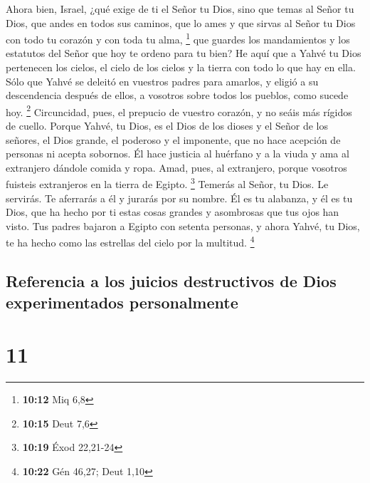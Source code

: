  Ahora bien, Israel, ¿qué exige de ti el Señor tu Dios,
sino que temas al Señor tu Dios, que andes en todos sus caminos, que lo
ames y que sirvas al Señor tu Dios con todo tu corazón y con toda tu
alma, \footnote{\textbf{10:12} Miq 6,8}  que guardes los
mandamientos y los estatutos del Señor que hoy te ordeno para tu bien?
 He aquí que a Yahvé tu Dios pertenecen los cielos, el
cielo de los cielos y la tierra con todo lo que hay en ella.
 Sólo que Yahvé se deleitó en vuestros padres para
amarlos, y eligió a su descendencia después de ellos, a vosotros sobre
todos los pueblos, como sucede hoy. \footnote{\textbf{10:15} Deut 7,6}
 Circuncidad, pues, el prepucio de vuestro corazón, y no
seáis más rígidos de cuello.  Porque Yahvé, tu Dios, es
el Dios de los dioses y el Señor de los señores, el Dios grande, el
poderoso y el imponente, que no hace acepción de personas ni acepta
sobornos.  Él hace justicia al huérfano y a la viuda y
ama al extranjero dándole comida y ropa.  Amad, pues, al
extranjero, porque vosotros fuisteis extranjeros en la tierra de Egipto.
\footnote{\textbf{10:19} Éxod 22,21-24}  Temerás al
Señor, tu Dios. Le servirás. Te aferrarás a él y jurarás por su nombre.
 Él es tu alabanza, y él es tu Dios, que ha hecho por ti
estas cosas grandes y asombrosas que tus ojos han visto. 
Tus padres bajaron a Egipto con setenta personas, y ahora Yahvé, tu
Dios, te ha hecho como las estrellas del cielo por la multitud.
\footnote{\textbf{10:22} Gén 46,27; Deut 1,10}

\hypertarget{referencia-a-los-juicios-destructivos-de-dios-experimentados-personalmente}{%
\subsection{Referencia a los juicios destructivos de Dios experimentados
personalmente}\label{referencia-a-los-juicios-destructivos-de-dios-experimentados-personalmente}}

\hypertarget{section-10}{%
\section{11}\label{section-10}}

